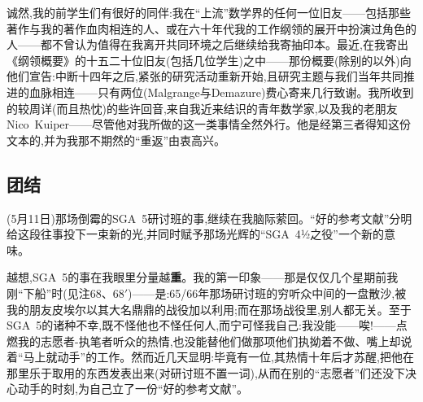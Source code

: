 诚然,我的前学生们有很好的同伴:我在“上流”数学界的任何一位旧友——包括那些著作与我的著作血肉相连的人、或在六十年代我的工作纲领的展开中扮演过角色的人——都不曾认为值得在我离开共同环境之后继续给我寄抽印本。最近,在我寄出《纲领概要》的十五二十位旧友(包括几位学生)之中——那份概要(除别的以外)向他们宣告:中断十四年之后,紧张的研究活动重新开始,且研究主题与我们当年共同推进的血脉相连——只有两位(Malgrange与Demazure)费心寄来几行致谢。我所收到的较周详(而且热忱)的些许回音,来自我近来结识的青年数学家,以及我的老朋友Nico~Kuiper——尽管他对我所做的这一类事情全然外行。他是经第三者得知这份文本的,并为我那不期然的“重返”由衷高兴。

\subsection{团结}


(5月11日)那场倒霉的SGA~5研讨班的事,继续在我脑际萦回。“好的参考文献”分明给这段往事投下一束新的光,并同时赋予那场光辉的“SGA~4½之役”一个新的意味。

越想,SGA~5的事在我眼里分量越\textbf{重}。我的第一印象——那是仅仅几个星期前我刚“下船”时(见注68、68$'$)——是:65/66年那场研讨班的穷听众中间的一盘散沙,被我的朋友皮埃尔以其大名鼎鼎的战役加以利用;而在那场战役里,别人都无关。至于SGA~5的诸种不幸,既不怪他也不怪任何人,而宁可怪我自己:我没能——唉!——点燃我的志愿者-执笔者听众的热情,也没能替他们做那项他们执拗着不做、嘴上却说着“马上就动手”\dmark{}的工作。然而近几天显明:毕竟有一位,其热情十年后才苏醒,把他在那里乐于取用的东西发表出来(对研讨班不置一词),从而在别的“志愿者”们还没下决心动手的时刻,为自己立了一份“好的参考文献”。

